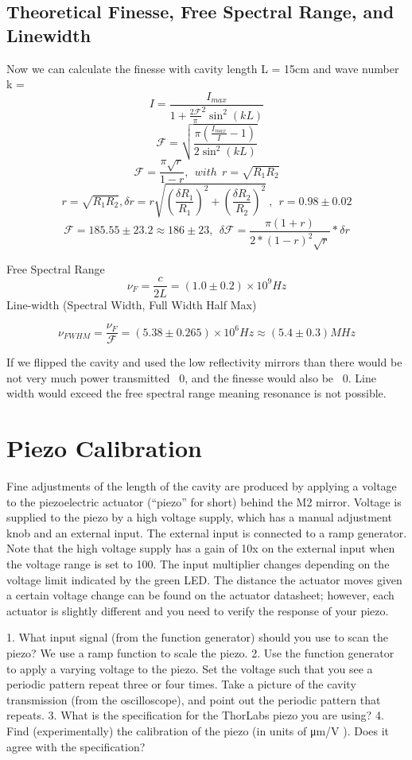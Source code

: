 \documentclass[11pt]{article}
\begin{document}
\subsection{Theoretical Finesse, Free Spectral Range, and Linewidth}

Now we can calculate the finesse with cavity length L = 15cm and wave number k = 
 $$I = \frac{I_{max}}{1 + \frac{2\mathscr{F}}{\pi}^2\sin^2(kL)} $$
 $$\mathscr{F} = \sqrt{ \frac{\pi(\frac{I_{max}}{I} - 1)}{2\sin^2(kL)}}$$
 $$\mathscr{F} = \frac{\pi\sqrt{r}}{1-r},\ \ with \ \ r = \sqrt{R_1R_2}$$
$$ r = \sqrt{R_1R_2}, \delta r = r \sqrt{(\frac{\delta R_1}{R_1})^2 + (\frac{\delta R_2}{R_2})^2}\ ,\ \  r = 0.98 \pm 0.02 $$ 
$$\mathscr{F} = 185.55 \pm 23.2 \approx 186 \pm 23 , \ \  \delta \mathscr{F} = \frac{\pi (1+r)}{2*(1-r)^2\sqrt{r}} * \delta r$$

Free Spectral Range
$$ \nu_F = \frac{c}{2L} = (1.0 \pm 0.2)\times 10^9 Hz $$
Line-width (Spectral Width, Full Width Half Max)

$$\nu_{FWHM} = \frac{\nu_F}{\mathscr{F}} = (5.38 \pm 0.265 )\times 10^6 Hz \approx (5.4\pm0.3)MHz $$

If we flipped the cavity and used the low reflectivity mirrors than there would be not very much power transmitted ~0, and the finesse would also be ~0. Line width would exceed the free spectral range meaning resonance is not possible. 

\section{Piezo Calibration}
Fine adjustments of the length of the cavity are produced by applying a voltage to the piezoelectric actuator (“piezo” for short) behind the M2 mirror. Voltage is supplied to the piezo by a high voltage supply, which has a manual adjustment knob and an external input. The external input is connected to a ramp generator. Note that the high voltage supply has a gain of 10x on the external input when the voltage range is set to 100. The input multiplier changes depending on the voltage limit indicated by the green LED. The distance the actuator moves given a certain voltage change can be found on the actuator datasheet; however, each actuator is slightly different and you need to verify the response of your piezo.

1. What input signal (from the function generator) should you use to scan the piezo?
We use a ramp function to scale the piezo.
2. Use the function generator to apply a varying voltage to the piezo. Set the voltage such that you see a periodic pattern repeat three or four times. Take a picture of the cavity transmission (from the oscilloscope), and point out the periodic pattern that repeats.
3. What is the specification for the ThorLabs piezo you are using?
4. Find (experimentally) the calibration of the piezo (in units of μm/V ). Does it agree with the specification?
\end{document}
